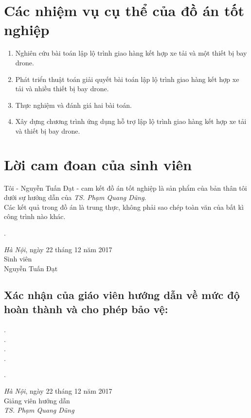 \documentclass[a4paper,12pt]{report}
\begin{document}
\section*{Các nhiệm vụ cụ thể của đồ án tốt nghiệp}
\begin{enumerate}
\item Nghiên cứu bài toán lập lộ trình giao hàng kết hợp xe tải và một thiết bị bay drone.
\item Phát triển thuật toán giải quyết bài toán lập lộ trình giao hàng kết hợp xe tải và nhiều thiết bị bay drone.
\item Thực nghiệm và đánh giá hai bài toán.
\item Xây dựng chương trình ứng dụng hỗ trợ lập lộ trình giao hàng kết hợp xe tải và thiết bị bay drone.
\end{enumerate}
\section*{Lời cam đoan của sinh viên}
Tôi - Nguyễn Tuấn Đạt - cam kết đồ án tốt nghiệp là sản phẩm  của bản thân tôi dưới sự hướng dẫn của \textit{TS. Phạm Quang Dũng}.  \\

Các kết quả trong đồ án 	là trung thực, không phải sao chép toàn văn của bất kì công trình nào khác.\\

\begin{minipage}{0.5\textwidth}
.
\end{minipage}
\begin{minipage}[t]{0.5\textwidth}

\begin{center}
\textit{Hà Nội}, ngày 22 tháng 12 năm 2017 \\
Sinh viên\\[3cm]

Nguyễn Tuấn Đạt
\end{center}
\end{minipage}
\subsection*{Xác nhận của giáo viên hướng dẫn về mức độ hoàn thành và cho phép bảo vệ:}
.\dotfill \\
.\dotfill \\ 
 .\dotfill \\ 
 .\dotfill \\
 \begin{minipage}{0.5\textwidth}
.
\end{minipage}
\begin{minipage}[t]{0.5\textwidth}

\begin{center}
\textit{Hà Nội}, ngày 22 tháng 12 năm 2017 \\
Giảng viên hướng dẫn\\[3cm]

\textit{TS. Phạm Quang Dũng}
\end{center}
\end{minipage}
\end{document}
